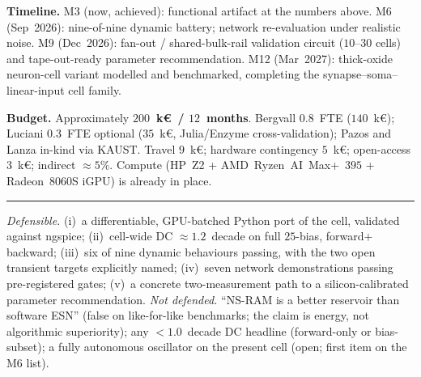 \documentclass[fontsize=9pt]{article}
\begin{document}
\textbf{Timeline.}
M3 (now, achieved): functional artifact at the numbers above.
M6 (Sep~2026): nine-of-nine dynamic battery; network re-evaluation
under realistic noise.
M9 (Dec~2026): fan-out / shared-bulk-rail validation circuit
($10$--$30$ cells) and tape-out-ready parameter recommendation.
M12 (Mar~2027): thick-oxide neuron-cell variant modelled and
benchmarked, completing the synapse--soma--linear-input cell family.

\textbf{Budget.}
Approximately \textbf{$200$~k\euro\ / $12$~months}.
Bergvall $0.8$~FTE ($140$~k\euro); Luciani $0.3$~FTE optional
($35$~k\euro, Julia/Enzyme cross-validation);
Pazos and Lanza in-kind via KAUST. Travel $9$~k\euro; hardware
contingency $5$~k\euro; open-access $3$~k\euro; indirect $\approx 5\%$.
Compute (HP~Z2 + AMD~Ryzen~AI~Max+~$395$ + Radeon~$8060$S iGPU) is
already in place.

\vspace{2pt}\hrule\vspace{2pt}

{\footnotesize\emph{Defensible.}
(i)~a differentiable, GPU-batched Python port of the cell, validated
against ngspice; (ii)~cell-wide DC $\approx 1.2$~decade on full
$25$-bias, forward$+$backward; (iii)~six of nine dynamic behaviours
passing, with the two open transient targets explicitly named;
(iv)~seven network demonstrations passing pre-registered gates;
(v)~a concrete two-measurement path to a silicon-calibrated
parameter recommendation.
\emph{Not defended.} ``NS-RAM is a better reservoir than software
ESN'' (false on like-for-like benchmarks; the claim is energy, not
algorithmic superiority); any $<1.0$~decade DC headline (forward-only
or bias-subset); a fully autonomous oscillator on the present cell
(open; first item on the M6 list).}
\end{document}

